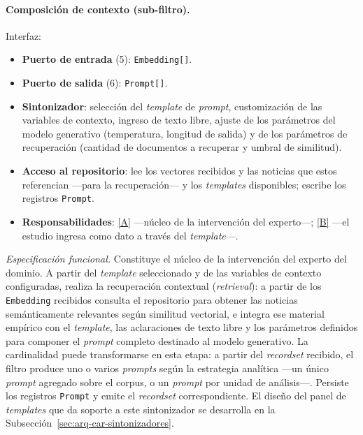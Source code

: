 \documentclass[12pt]{report}
\DeclareRobustCommand{\resp}[1]{\hyperref[tab:registro-responsabilidades]{\textcolor{respcolor}{[#1]}}}
\begin{document}
\paragraph{Composición de contexto (sub-filtro).} Interfaz:
\begin{itemize}
  \item \textbf{Puerto de entrada} (5): \texttt{Embedding[]}.
  \item \textbf{Puerto de salida} (6): \texttt{Prompt[]}.
  \item \textbf{Sintonizador}: selección del \textit{template} de \textit{prompt}, customización de las variables de contexto, ingreso de texto libre, ajuste de los parámetros del modelo generativo (temperatura, longitud de salida) y de los parámetros de recuperación (cantidad de documentos a recuperar y umbral de similitud).
  \item \textbf{Acceso al repositorio}: lee los vectores recibidos y las noticias que estos referencian ---para la recuperación--- y los \textit{templates} disponibles; escribe los registros \texttt{Prompt}.
  \item \textbf{Responsabilidades}: \resp{A} ---núcleo de la intervención del experto---; \resp{B} ---el estudio ingresa como dato a través del \textit{template}---.
\end{itemize}
\textit{Especificación funcional.} Constituye el núcleo de la intervención del experto del dominio. A partir del \textit{template} seleccionado y de las variables de contexto configuradas, realiza la recuperación contextual (\textit{retrieval}): a partir de los \texttt{Embedding} recibidos consulta el repositorio para obtener las noticias semánticamente relevantes según similitud vectorial, e integra ese material empírico con el \textit{template}, las aclaraciones de texto libre y los parámetros definidos para componer el \textit{prompt} completo destinado al modelo generativo. La cardinalidad puede transformarse en esta etapa: a partir del \textit{recordset} recibido, el filtro produce uno o varios \textit{prompts} según la estrategia analítica ---un único \textit{prompt} agregado sobre el corpus, o un \textit{prompt} por unidad de análisis---. Persiste los registros \texttt{Prompt} y emite el \textit{recordset} correspondiente. El diseño del panel de \textit{templates} que da soporte a este sintonizador se desarrolla en la Subsección~\ref{sec:arq-car-sintonizadores}.
\end{document}

